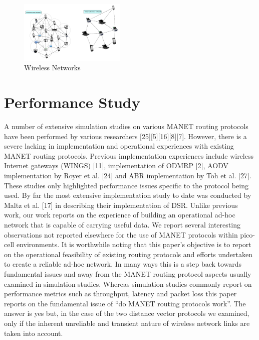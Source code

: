 \documentclass[letterpaper, 10 pt, conference]{ieeeconf}  %
\begin{document}
\begin{figure}[H]
\includegraphics[width=0.45\textwidth]{infastructurelessNetwork1}
\caption{Wireless Networks}
\label{fig:infastructurelessNetwork1}
\end{figure}

\section{Performance Study}
A number of extensive simulation studies on various MANET
routing protocols have been performed by various researchers
[25][5][16][8][7]. However, there is a severe lacking in implementation
and operational experiences with existing MANET
routing protocols. Previous implementation experiences include
wireless Internet gateways (WINGS) [11], implementation
of ODMRP [2], AODV implementation by Royer et
al. [24] and ABR implementation by Toh et al. [27]. These
studies only highlighted performance issues specific to the
protocol being used. By far the most extensive implementation
study to date was conducted by Maltz et al. [17] in
describing their implementation of DSR.
Unlike previous work, our work reports on the experience
of building an operational ad-hoc network that is capable
of carrying useful data. We report several interesting observations
not reported elsewhere for the use of MANET
protocols within pico-cell environments. It is worthwhile
noting that this paper’s objective is to report on the operational
feasibility of existing routing protocols and efforts undertaken
to create a reliable ad-hoc network. In many ways
this is a step back towards fundamental issues and away from
the MANET routing protocol aspects usually examined in
simulation studies. Whereas simulation studies commonly
report on performance metrics such as throughput, latency
and packet loss this paper reports on the fundamental issue
of “do MANET routing protocols work”. The answer is yes
but, in the case of the two distance vector protocols we examined,
only if the inherent unreliable and transient nature
of wireless network links are taken into account.
\end{document}
